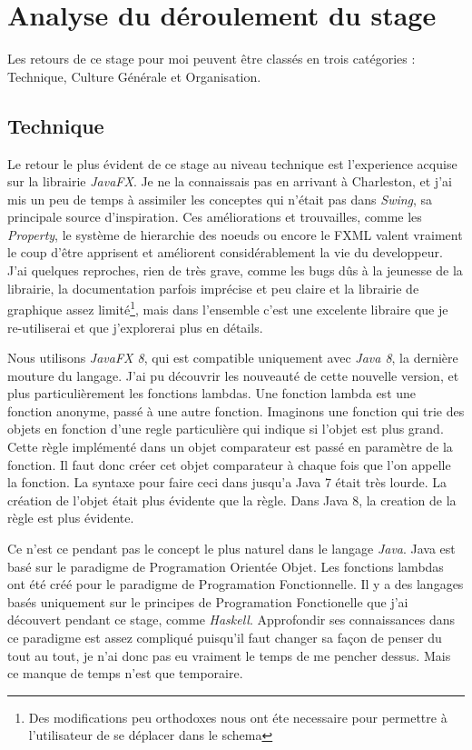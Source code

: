 \chapter{Analyse du déroulement du stage}
Les retours de ce stage pour moi peuvent être classés en trois catégories : Technique, Culture Générale et Organisation.

\section{Technique}
Le retour le plus évident de ce stage au niveau technique est l'experience acquise sur la librairie \textit{JavaFX}. Je ne la connaissais pas en arrivant à Charleston, et j'ai mis un peu de temps à assimiler les conceptes qui n'était pas dans \textit{Swing}, sa principale source d'inspiration. Ces améliorations et trouvailles, comme les \textit{Property}, le système de hierarchie des noeuds ou encore le FXML valent vraiment le coup d'être apprisent et améliorent considérablement la vie du developpeur. J'ai quelques reproches, rien de très grave, comme les bugs dûs à la jeunesse de la librairie, la documentation parfois imprécise et peu claire et la librairie de graphique assez limité\footnote{Des modifications peu orthodoxes nous ont éte necessaire pour permettre à l'utilisateur de se déplacer dans le schema}, mais dans l'ensemble c'est une excelente libraire que je re-utiliserai et que j'explorerai plus en détails.

Nous utilisons \textit{JavaFX 8}, qui est compatible uniquement avec \textit{Java 8}, la dernière mouture du langage. J'ai pu découvrir les nouveauté de cette nouvelle version, et plus particulièrement les fonctions lambdas. Une fonction lambda est une fonction anonyme, passé à une autre fonction. Imaginons une fonction qui trie des objets en fonction d'une regle particulière qui indique si l'objet est plus grand. Cette règle implémenté dans un objet comparateur est passé en paramètre de la fonction. Il faut donc créer cet objet comparateur à chaque fois que l'on appelle la fonction. La syntaxe pour faire ceci dans jusqu'a Java 7 était très lourde. La création de l'objet était plus évidente que la règle. Dans Java 8, la creation de la règle est plus évidente.

Ce n'est ce pendant pas le concept le plus naturel dans le langage \textit{Java}. Java est basé sur le paradigme de Programation Orientée Objet. Les fonctions lambdas ont été créé pour le paradigme de Programation Fonctionnelle. Il y a des langages basés uniquement sur le principes de Programation Fonctionelle que j'ai découvert pendant ce stage, comme \textit{Haskell}. Approfondir ses connaissances dans ce paradigme est assez compliqué puisqu'il faut changer sa façon de penser du tout au tout, je n'ai donc pas eu vraiment le temps de me pencher dessus. Mais ce manque de temps n'est que temporaire.

